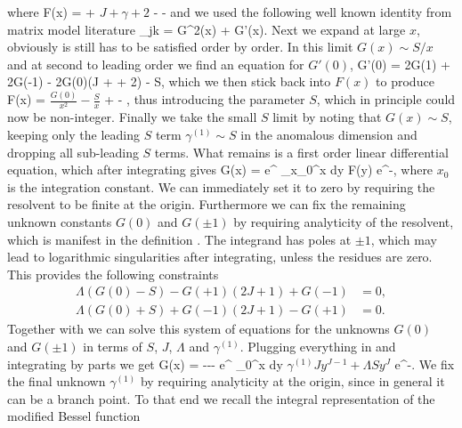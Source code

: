 \eeq
where
\beq
	F(x) =  + \( J + \gamma + 2 \) -  - 
\eeq
and we used the following well known identity from matrix model literature
\beq
	\sum_{j\neq k}  = G^2(x) + G'(x).
\eeq
Next we expand  at large $x$, obviously is still has to be satisfied order by order.
In this limit $G(x) \sim S/x$ and at second to leading order we find an equation for $G'(0)$,
\beq
	\Lambda G'(0) = 2G(1) + 2G(-1) - 2G(0)(J + \gamma + 2) - \Lambda S,
\eeq
which we then stick back into $F(x)$ to produce
\beq
	F(x) = \( \frac{G(0)}{x^2} - \frac{S}{x} \) +  - ,
\eeq
thus introducing the parameter $S$, which in principle could now be non-integer.
Finally we take the small $S$ limit by noting that $G(x) \sim S$, keeping only the leading $S$ term $\gamma^{(1)} \sim S$ in the anomalous dimension and dropping all sub-leading $S$ terms. 
What remains is a first order linear differential equation, which after integrating gives
\beq
	G(x) =  e^{\Lambda {}} \int_{x_0}^x dy \; F(y)  e^{-\Lambda {}},
\eeq
where $x_0$ is the integration constant.
We can immediately set it to zero by requiring the resolvent to be finite at the origin.
Furthermore we can fix the remaining unknown constants $G(0)$ and $G(\pm 1)$ by requiring analyticity of the resolvent, which is manifest in the definition .
The integrand has poles at $\pm 1$, which may lead to logarithmic singularities after integrating, unless the residues are zero.
This provides the following constraints
\begin{subequations}
  \begin{align}
	\Lambda(G(0)-S) - G(+1)(2J+1)+G(-1) &= 0, \\
	\Lambda(G(0)+S) + G(-1)(2J+1)-G(+1) &= 0.
  \end{align}
\end{subequations}
Together with  we can solve this system of equations for the unknowns $G(0)$ and $G(\pm 1)$ in terms of $S$, $J$, $\Lambda$ and $\gamma^{(1)}$.
Plugging everything in and integrating by parts we get
\beq
\label{eq:Gfinal}
G(x) = ---  e^{\Lambda {}} \int_0^x dy \( \gamma^{(1)} J y^{J-1} + \Lambda S y^J \) e^{-\Lambda {}}.
\eeq
We fix the final unknown $\gamma^{(1)}$ by requiring analyticity at the origin, since in general it can be a branch point. To that end we recall the integral representation of the modified Bessel function
